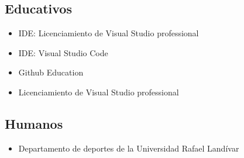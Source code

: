 \documentclass[twoside,twocolumn]{article}
\begin{document}
\subsection{Educativos}
\begin{itemize}
\item IDE: Licenciamiento de Visual Studio professional
\item IDE: Visual Studio Code
\item Github Education
\item Licenciamiento de Visual Studio professional 
\end{itemize}
\subsection{Humanos}
\begin{itemize}
\item Departamento de deportes de la Universidad Rafael Landívar
\end{itemize}
\end{document}
